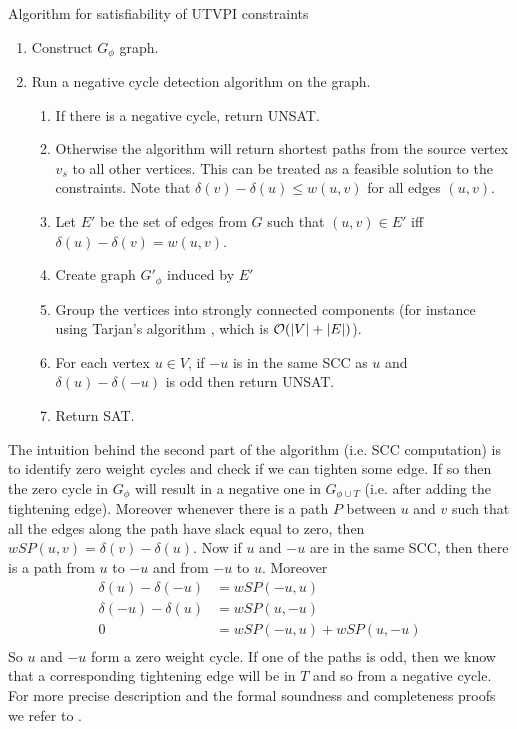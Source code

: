 \begin{table}
\caption{Algorithm for satisfiability of UTVPI constraints}
\label{tab:utvpi_sat}
\begin{enumerate}
\item Construct $G_\phi$ graph.
\item Run a negative cycle detection algorithm on the graph.
  \begin{enumerate}
  \item If there is a negative cycle, return UNSAT.
  \item Otherwise the algorithm will return shortest paths from the source
    vertex $v_s$ to all other vertices. This can be treated as a feasible solution
    to the constraints. Note that $\delta(v) - \delta(u) \leq w(u, v)$ for all
    edges $(u, v)$.
  \item Let $E'$ be the set of edges from $G$ such that $(u, v) \in E'$ iff
    $\delta(u) - \delta(v) = w(u, v)$.
  \item Create graph $G'_\phi$ induced by $E'$
  \item Group the vertices into strongly connected components (for instance
    using Tarjan's algorithm \cite{bib:tarjan_dfs}, which is
    $\mathcal{O}(|V| + |E|)$).
  \item For each vertex $u \in V$, if $-u$ is in the same SCC as $u$ and
    $\delta(u) - \delta(-u)$ is odd then return UNSAT.
  \item Return SAT.
  \end{enumerate}
\end{enumerate}
\end{table}
The intuition behind the second part of the algorithm (i.e. SCC computation) is
to identify zero weight cycles and check if we can tighten some edge. If so then
the zero cycle in $G_\phi$ will result in a negative one in $G_{\phi \cup T}$ (i.e.
after adding the tightening edge). Moreover whenever there is a path $P$ between
$u$ and $v$ such that all the edges along the path have slack equal to zero,
then $wSP(u, v) = \delta(v) - \delta(u)$. Now if $u$ and $-u$ are in the same
SCC, then there is a path from $u$ to $-u$ and from $-u$ to $u$.
Moreover
\begin{align*}
\delta(u) - \delta(-u) & = wSP(-u, u) \\
\delta(-u) - \delta(u) & = wSP(u, -u) \\
0 & = wSP(-u, u) + wSP(u, -u) \\
\end{align*}
So $u$ and $-u$ form a zero weight cycle. If one of the paths is odd, then we
know that a corresponding tightening edge will be in $T$ and so from a negative
cycle. For more precise description and the formal soundness and completeness
proofs we refer to \cite{bib:ms_utvpi}.

